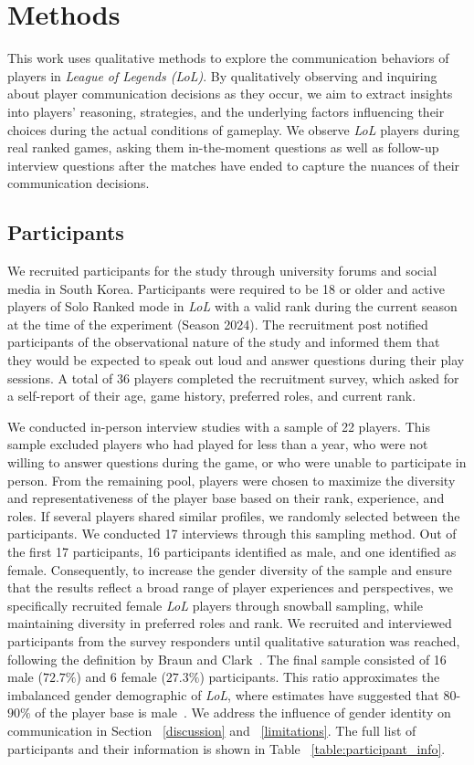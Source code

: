 \section{Methods}
This work uses qualitative methods to explore the communication behaviors of players in \textit{League of Legends (LoL)}. By qualitatively observing and inquiring about player communication decisions as they occur, we aim to extract insights into players' reasoning, strategies, and the underlying factors influencing their choices during the actual conditions of gameplay. We observe \textit{LoL} players during real ranked games, asking them in-the-moment questions as well as follow-up interview questions after the matches have ended to capture the nuances of their communication decisions. 

\subsection{Participants}
We recruited participants for the study through university forums and social media in South Korea. Participants were required to be 18 or older and active players of Solo Ranked mode in \textit{LoL} with a valid rank during the current season at the time of the experiment (Season 2024). The recruitment post notified participants of the observational nature of the study and informed them that they would be expected to speak out loud and answer questions during their play sessions. A total of 36 players completed the recruitment survey, which asked for a self-report of their age, game history, preferred roles, and current rank.

We conducted in-person interview studies with a sample of 22 players. This sample excluded players who had played for less than a year, who were not willing to answer questions during the game, or who were unable to participate in person. From the remaining pool, players were chosen to maximize the diversity and representativeness of the player base based on their rank, experience, and roles. If several players shared similar profiles, we randomly selected between the participants. We conducted 17 interviews through this sampling method. Out of the first 17 participants, 16 participants identified as male, and one identified as female. Consequently, to increase the gender diversity of the sample and ensure that the results reflect a broad range of player experiences and perspectives, we specifically recruited female \textit{LoL} players through snowball sampling, while maintaining diversity in preferred roles and rank. We recruited and interviewed participants from the survey responders until qualitative saturation was reached, following the definition by Braun and Clark~\cite{braun2021saturation}. The final sample consisted of 16 male ($72.7\%$) and 6 female ($27.3\%$) participants. This ratio approximates the imbalanced gender demographic of \textit{LoL}, where estimates have suggested that $80$-$90\%$ of the player base is male~\cite{kordyaka2023gender}. We address the influence of gender identity on communication in Section ~\ref{discussion} and ~\ref{limitations}. The full list of participants and their information is shown in Table ~\ref{table:participant_info}.


